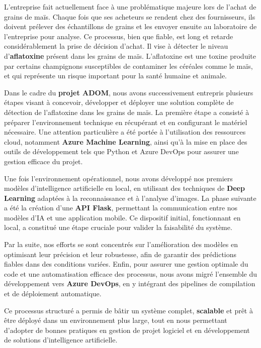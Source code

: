 \documentclass[12pt,a4paper]{report}
\begin{document}
\noindent
L’entreprise fait actuellement face à une problématique majeure lors de l’achat de grains de maïs.
Chaque fois que ses acheteurs se rendent chez des fournisseurs, ils doivent prélever des échantillons de grains
et les envoyer ensuite au laboratoire de l’entreprise pour analyse.
Ce processus, bien que fiable, est long et retarde considérablement la prise de décision d’achat.
Il vise à détecter le niveau d’\textbf{aflatoxine} présent dans les grains de maïs.
L’aflatoxine est une toxine produite par certains champignons susceptibles de contaminer les céréales comme le maïs,
et qui représente un risque important pour la santé humaine et animale.

\medskip
\noindent
Dans le cadre du \textbf{projet ADOM}, nous avons successivement entrepris plusieurs étapes visant à concevoir,
développer et déployer une solution complète de détection de l’aflatoxine dans les grains de maïs.
La première étape a consisté à préparer l’environnement technique en récupérant et en configurant le matériel nécessaire.
Une attention particulière a été portée à l’utilisation des ressources cloud, notamment \textbf{Azure Machine Learning},
ainsi qu’à la mise en place des outils de développement tels que Python et Azure DevOps
pour assurer une gestion efficace du projet.

\medskip
\noindent
Une fois l’environnement opérationnel, nous avons développé nos premiers modèles d’intelligence artificielle en local,
en utilisant des techniques de \textbf{Deep Learning} adaptées à la reconnaissance et à l’analyse d’images.
La phase suivante a été la création d’une \textbf{API Flask}, permettant la communication entre nos modèles d’IA
et une application mobile.
Ce dispositif initial, fonctionnant en local, a constitué une étape cruciale pour valider la faisabilité du système.

\medskip
\noindent
Par la suite, nos efforts se sont concentrés sur l’amélioration des modèles en optimisant leur précision et leur robustesse,
afin de garantir des prédictions fiables dans des conditions variées.
Enfin, pour assurer une gestion optimale du code et une automatisation efficace des processus,
nous avons migré l’ensemble du développement vers \textbf{Azure DevOps}, en y intégrant des pipelines de compilation
et de déploiement automatique.

\medskip
\noindent
Ce processus structuré a permis de bâtir un système complet, \textbf{scalable} et prêt à être déployé dans un environnement plus large,
tout en nous permettant d’adopter de bonnes pratiques en gestion de projet logiciel
et en développement de solutions d’intelligence artificielle.
\end{document}
